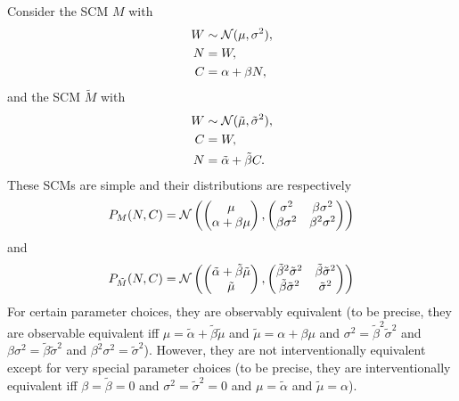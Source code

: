 \begin{Eg}
Consider the SCM $M$ with
  \begin{align*}
    W &\sim \mathcal{N}(\mu,\sigma^2), \\
    N &= W, \\
    C &= \alpha + \beta N,
  \end{align*}
and the SCM $\tilde{M}$ with
  \begin{align*}
    W &\sim \mathcal{N}(\tilde{\mu},\tilde{\sigma}^2), \\
    C &= W, \\
    N &= \tilde{\alpha} + \tilde{\beta} C.
  \end{align*}
These SCMs are simple and their distributions are respectively 
  $$P_M(N,C) = \mathcal{N}\left(\begin{pmatrix} \mu \\ \alpha + \beta \mu \end{pmatrix}, \begin{pmatrix} \sigma^2 & \beta\sigma^2 \\ \beta\sigma^2 & \beta^2\sigma^2\end{pmatrix}\right)$$
and
  $$P_{\tilde{M}}(N,C) = \mathcal{N}\left(\begin{pmatrix} \tilde{\alpha} + \tilde{\beta} \tilde{\mu} \\ \tilde{\mu} \end{pmatrix}, \begin{pmatrix} \tilde{\beta}^2\tilde{\sigma}^2 & \tilde{\beta}\tilde{\sigma}^2 \\ \tilde{\beta}\tilde{\sigma}^2 & \tilde{\sigma}^2\end{pmatrix}\right)$$
  For certain parameter choices, they are observably equivalent (to be precise, they are observable equivalent iff 
  $\mu = \tilde{\alpha} + \tilde{\beta}\tilde{\mu}$ and $\tilde{\mu} = \alpha + \beta\mu$ and $\sigma^2 = \tilde{\beta}^2\tilde{\sigma}^2$ and $\beta \sigma^2 = \tilde{\beta}\tilde{\sigma}^2$ and $\beta^2 \sigma^2 = \tilde{\sigma}^2$).
  However, they are not interventionally equivalent except for very special parameter choices (to be precise, they are interventionally equivalent iff $\beta = \tilde{\beta} = 0$ and $\sigma^2=\tilde{\sigma}^2=0$ and $\mu = \tilde{\alpha}$ and $\tilde{\mu} = \alpha$).
\end{Eg}

